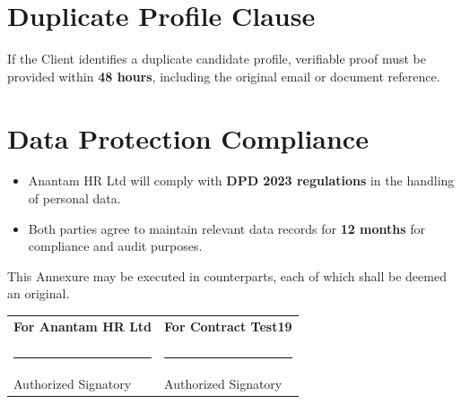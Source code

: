 \documentclass[12pt]{article}
\begin{document}
\section{Duplicate Profile Clause}

If the Client identifies a duplicate candidate profile, verifiable proof must be provided within \textbf{48 hours}, including the original email or document reference.

\section{Data Protection Compliance}

\begin{itemize}
\item Anantam HR Ltd will comply with \textbf{DPD 2023 regulations} in the handling of personal data.

\item Both parties agree to maintain relevant data records for \textbf{12 months} for compliance and audit purposes.
\end{itemize}

This Annexure may be executed in counterparts, each of which shall be deemed an original.

\vspace{1.5cm}

\begin{tabular}{p{7cm} p{7cm}}

\textbf{For Anantam HR Ltd} & \textbf{For Contract Test19} \\

\vspace{2cm} & \vspace{2cm} \\

\rule{6cm}{0.4pt} & \rule{6cm}{0.4pt} \\
Authorized Signatory & Authorized Signatory \\

\end{tabular}
\end{document}

